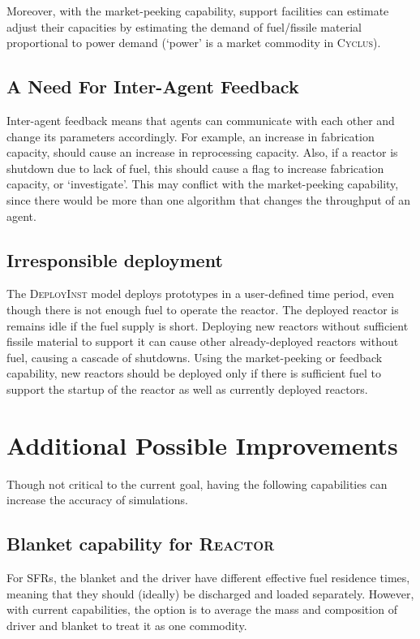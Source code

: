 \documentclass{article}
\newcommand{\Cyclus}{\textsc{Cyclus}\xspace}%
\begin{document}
Moreover, with the market-peeking capability, support facilities can estimate adjust their
capacities by estimating
the demand of fuel/fissile material proportional to power demand (`power' is a market commodity in \Cyclus).

\subsection{A Need For Inter-Agent Feedback}
Inter-agent feedback means that agents can communicate with each other and change its parameters accordingly. 
For example, an increase in fabrication capacity, should cause an increase in reprocessing capacity. Also,
if a reactor is shutdown due to lack of fuel, this should cause a flag to increase fabrication capacity,
or `investigate'.
This may conflict with the market-peeking capability, since there would be more than one algorithm
that changes the throughput of an agent. 

\subsection{Irresponsible deployment}
The \textsc{DeployInst}\xspace model deploys prototypes in a user-defined time period, even though there is not 
enough fuel to operate the reactor. The deployed reactor is remains idle if the fuel supply is short. Deploying new reactors
without sufficient fissile material to support it can cause other already-deployed reactors without fuel, causing
a cascade of shutdowns. Using the market-peeking or feedback capability, new reactors should be deployed only
if there is sufficient fuel to support the startup of the reactor as well as currently deployed reactors. 


\section{Additional Possible Improvements}
Though not critical to the current goal, having the following capabilities can increase
the accuracy of simulations.


\subsection{Blanket capability for \textsc{Reactor}\xspace}
For \glspl{SFR}, the blanket and the driver have different effective fuel residence times, meaning that
they should (ideally) be discharged and loaded separately. However, with current capabilities, the option is to average
the mass and composition of driver and blanket to treat it as one commodity.
\end{document}
